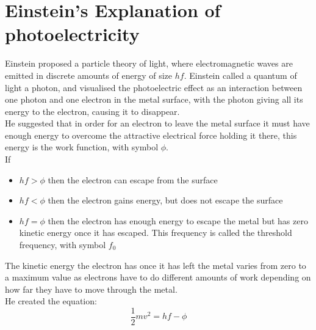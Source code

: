 \documentclass[12pt]{article}
\begin{document}
\section{Einstein's Explanation of photoelectricity}
Einstein proposed a particle theory of light, where electromagnetic waves are emitted in discrete amounts of energy of size $hf$. Einstein called a quantum of light a photon, and visualised the photoelectric effect as an interaction between one photon and one electron in the metal surface, with the photon giving all its energy to the electron, causing it to disappear.\\
He suggested that in order for an electron to leave the metal surface it must have enough energy to overcome the attractive electrical force holding it there, this energy is the work function, with symbol $\phi$. \\
If 
\begin{itemize}
\item $hf>\phi$ then the electron can escape from the surface
\item $hf<\phi$ then the electron gains energy, but does not escape the surface
\item $hf=\phi$ then the electron has enough energy to escape the metal but has zero kinetic energy once it has escaped. This frequency is called the threshold frequency, with symbol $f_0$
\end{itemize}
The kinetic energy the electron has once it has left the metal varies from zero to a maximum value as electrons have to do different amounts of work depending on how far they have to move through the metal.\\
He created the equation:
$$\frac{1}{2}mv^2=hf-\phi$$
\\
\\
\end{document}
